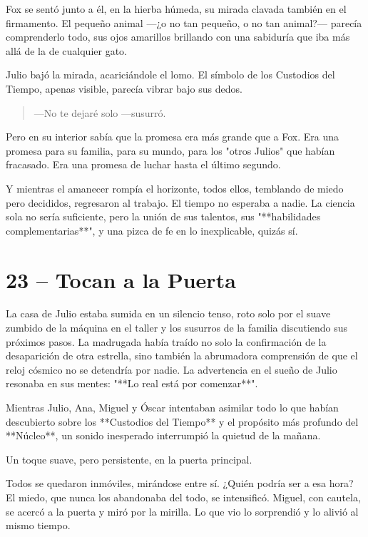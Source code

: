 \documentclass[a4paper,12pt]{book}
\begin{document}
Fox se sentó junto a él, en la hierba húmeda, su mirada clavada también en el firmamento. El pequeño animal —¿o no tan pequeño, o no tan animal?— parecía comprenderlo todo, sus ojos amarillos brillando con una sabiduría que iba más allá de la de cualquier gato.

Julio bajó la mirada, acariciándole el lomo. El símbolo de los Custodios del Tiempo, apenas visible, parecía vibrar bajo sus dedos.

\begin{quote}
    —No te dejaré solo —susurró.
\end{quote}

Pero en su interior sabía que la promesa era más grande que a Fox. Era una promesa para su familia, para su mundo, para los "otros Julios" que habían fracasado. Era una promesa de luchar hasta el último segundo.

Y mientras el amanecer rompía el horizonte, todos ellos, temblando de miedo pero decididos, regresaron al trabajo. El tiempo no esperaba a nadie. La ciencia sola no sería suficiente, pero la unión de sus talentos, sus "**habilidades complementarias**", y una pizca de fe en lo inexplicable, quizás sí.

\cleardoublepage %

\chapter*{23 – Tocan a la Puerta}

La casa de Julio estaba sumida en un silencio tenso, roto solo por el suave zumbido de la máquina en el taller y los susurros de la familia discutiendo sus próximos pasos. La madrugada había traído no solo la confirmación de la desaparición de otra estrella, sino también la abrumadora comprensión de que el reloj cósmico no se detendría por nadie. La advertencia en el sueño de Julio resonaba en sus mentes: "**Lo real está por comenzar**".

Mientras Julio, Ana, Miguel y Óscar intentaban asimilar todo lo que habían descubierto sobre los **Custodios del Tiempo** y el propósito más profundo del **Núcleo**, un sonido inesperado interrumpió la quietud de la mañana.

Un toque suave, pero persistente, en la puerta principal.

Todos se quedaron inmóviles, mirándose entre sí. ¿Quién podría ser a esa hora? El miedo, que nunca los abandonaba del todo, se intensificó. Miguel, con cautela, se acercó a la puerta y miró por la mirilla. Lo que vio lo sorprendió y lo alivió al mismo tiempo.
\end{document}
